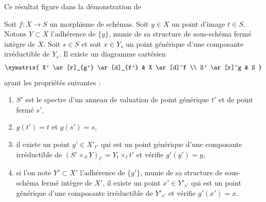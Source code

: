 \begin{lemma}
\label{lemma-make-base-change}
\begin{reference}
Ce résultat figure dans la démonstration de
\cite[IV Proposition 12.1.1.5]{EGA}
\end{reference}
Soit $f : X \to S$ un morphisme de schémas. Soit $y \in X$ un point
d'image $t \in S$. Notons $Y \subset X$ l'adhérence de $\{y\}$,
munie de sa structure de sous-schéma fermé intègre de $X$. Soit $s \in S$ et soit
$x \in Y_s$ un point générique d'une composante irréductible de $Y_s$.
Il existe un diagramme cartésien
$$
\xymatrix{
X' \ar[r]_{g'} \ar[d]_{f'} & X \ar[d]^f \\
S' \ar[r]^g & S
}
$$
ayant les propriétés suivantes :
\begin{enumerate}
\item $S'$ est le spectre d'un anneau de valuation
de point générique $t'$ et de point fermé $s'$,
\item $g(t') = t$ et $g(s') = s$,
\item il existe un point $y' \in X'_{t'}$ qui est
un point générique d'une composante irréductible de
$(S' \times_S Y)_{t'} = Y_t \times_t t'$
et vérifie $g'(y') = y$,
\item si l'on note $Y' \subset X'$ l'adhérence de $\{y'\}$,
munie de sa structure de sous-schéma fermé intègre de $X'$,
il existe un point $x' \in Y'_{s'}$ qui est un point générique
d'une composante irréductible de $Y'_{s'}$
et vérifie $g'(x') = x$.
\end{enumerate}
\end{lemma}

